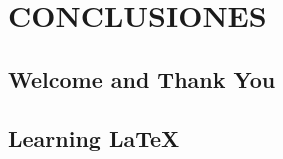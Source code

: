 
\chapter{CONCLUSIONES} %

\label{Chapter5} %

\section{Welcome and Thank You}


\section{Learning \LaTeX{}}